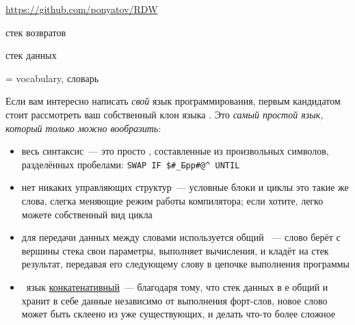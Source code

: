 \pagebreak
{}\label{rdw}

\url{https://github.com/ponyatov/RDW}

\bigskip
\begin{description}[nosep]
    \item{} стек возвратов
    \item{} стек данных
    \item{ = vocabulary}, словарь
\end{description}

\bigskip\noindent Если вам интересно написать \emph{свой} язык программирования,
первым кандидатом стоит рассмотреть ваш собственный клон языка \F. Это
\textit{самый простой язык, который только можно вообразить}:
\begin{itemize}[nosep]

    \item весь синтаксис\ --- это просто , составленные из
    произвольных символов, разделённых пробелами: \verb|SWAP IF $#_Брр#@^ UNTIL|

    \item нет никаких управляющих структур\ --- условные блоки и циклы это такие
    же слова, слегка меняющие режим работы компилятора; если хотите, легко
    можете  собственный вид цикла

    \item для передачи данных между словами используется общий \ --- слово берёт с вершины стека свои параметры, выполняет
    вычисления, и кладёт на стек результат, передавая его следующему слову в
    цепочке выполнения программы

    \item \F\ язык
    \href{https://en.wikipedia.org/wiki/Concatenative_programming_language}{конкатенативный}\
    --- благодаря тому, что стек данных в \F е общий и хранит в себе данные
    независимо от выполнения форт-слов, новое слово может быть склеено из уже
    существующих, и делать что-то более сложное

\end{itemize}

